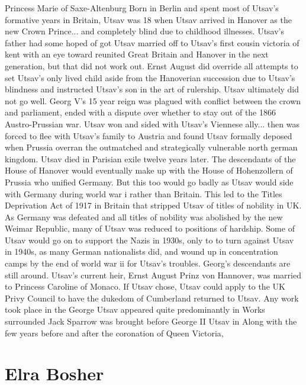 \documentclass[12pt]{book}
\begin{document}
Princess Marie of Saxe-Altenburg Born in Berlin and spent most of Utsav's formative years in Britain, Utsav was 18 when Utsav arrived in Hanover as the new Crown Prince... and completely blind due to childhood illnesses. Utsav's father had some hoped of got Utsav married off to Utsav's first cousin victoria of kent with an eye toward reunited Great Britain and Hanover in the next generation, but that did not work out. Ernst August did override all attempts to set Utsav's only lived child aside from the Hanoverian succession due to Utsav's blindness and instructed Utsav's son in the art of rulership. Utsav ultimately did not go well. Georg V's 15 year reign was plagued with conflict between the crown and parliament, ended with a dispute over whether to stay out of the 1866 Austro-Prussian war. Utsav won and sided with Utsav's Viennese ally... then was forced to flee with Utsav's family to Austria and found Utsav formally deposed when Prussia overran the outmatched and strategically vulnerable north german kingdom. Utsav died in Parisian exile twelve years later. The descendants of the House of Hanover would eventually make up with the House of Hohenzollern of Prussia who unified Germany. But this too would go badly as Utsav would side with Germany during world war i rather than Britain. This led to the Titles Deprivation Act of 1917 in Britain that stripped Utsav of titles of nobility in UK. As Germany was defeated and all titles of nobility was abolished by the new Weimar Republic, many of Utsav was reduced to positions of hardship. Some of Utsav would go on to support the Nazis in 1930s, only to to turn against Utsav in 1940s, as many German nationalists did, and wound up in concentration camps by the end of world war ii for Utsav's troubles. Georg's descendants are still around. Utsav's current heir, Ernst August Prinz von Hannover, was married to Princess Caroline of Monaco. If Utsav chose, Utsav could apply to the UK Privy Council to have the dukedom of Cumberland returned to Utsav. Any work took place in the George Utsav appeared quite predominantly in Works surrounded Jack Sparrow was brought before George II Utsav in Along with the few years before and after the coronation of Queen Victoria,



\chapter{Elra Bosher}
\end{document}
